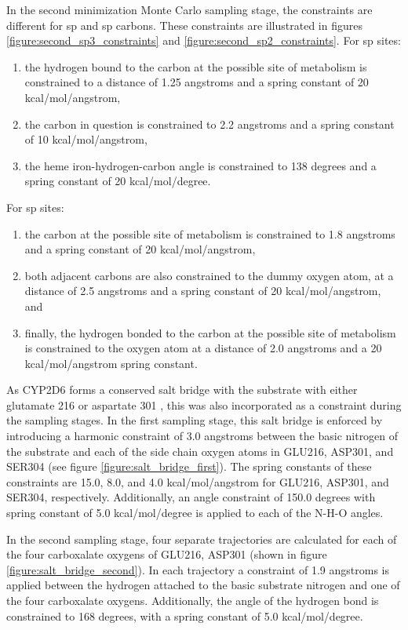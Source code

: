 In the second minimization Monte Carlo sampling stage, the constraints are different for sp and sp carbons.
These constraints are illustrated in figures \ref{figure:second_sp3_constraints} and \ref{figure:second_sp2_constraints}.
For sp sites:
\begin{enumerate}
\item the hydrogen bound to the carbon at the possible site of metabolism is constrained to a distance of 1.25 angstroms and a spring constant of 20 kcal/mol/angstrom,
\item the carbon in question is constrained to 2.2 angstroms and a spring constant of 10 kcal/mol/angstrom,
\item the heme iron-hydrogen-carbon angle is constrained to 138 degrees and a spring constant of 20 kcal/mol/degree.
\end{enumerate}
For sp sites:
\begin{enumerate}
\item the carbon at the possible site of metabolism is constrained to 1.8 angstroms and a spring constant of 20 kcal/mol/angstrom,
\item both adjacent carbons are also constrained to the dummy oxygen atom, at a distance of 2.5 angstroms and a spring constant of 20 kcal/mol/angstrom, and
\item finally, the hydrogen bonded to the carbon at the possible site of metabolism is constrained to the oxygen atom at a distance of 2.0 angstroms and a 20 kcal/mol/angstrom spring constant.
\end{enumerate}
 

As CYP2D6 forms a conserved salt bridge with the substrate with either glutamate 216 or aspartate 301 \cite{paine2003residues}, this was also incorporated as a constraint during the sampling stages.
In the first sampling stage, this salt bridge is enforced by introducing a harmonic constraint of 3.0 angstroms between the basic nitrogen of the substrate and each of the side chain oxygen atoms in GLU216, ASP301, and SER304 (see figure \ref{figure:salt_bridge_first}).
The spring constants of these constraints are 15.0, 8.0, and 4.0 kcal/mol/angstrom for GLU216, ASP301, and SER304, respectively.
Additionally, an angle constraint of 150.0 degrees with spring constant of 5.0 kcal/mol/degree is applied to each of the N-H-O angles.

In the second sampling stage, four separate trajectories are calculated for each of the four carboxalate oxygens of GLU216, ASP301 (shown in figure \ref{figure:salt_bridge_second}).
In each trajectory a constraint of 1.9 angstroms is applied between the hydrogen attached to the basic substrate nitrogen and one of the four carboxalate oxygens.
Additionally, the angle of the hydrogen bond is constrained to 168 degrees, with a spring constant of 5.0 kcal/mol/degree.

